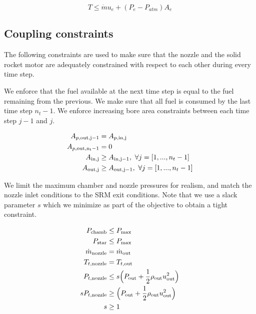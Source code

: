 \begin{equation}
    T \leq \dot{m} u_e + (P_e - P_{atm}) A_e
\end{equation}

\subsection{Coupling constraints}

The following constraints are used to make sure that the nozzle
and the solid rocket motor are adequately constrained
with respect to each other during every time step.

We enforce that the fuel available at the next time step is equal to the fuel
remaining from the previous. We make sure that all fuel is consumed
by the last time step $n_t-1$.
We enforce increasing bore area constraints between each
time step $j-1$ and $j$.

\begin{align}
    A_{p,\rm{out}, j-1} &= A_{p,\rm{in}, j} \\
    A_{p,\rm{out}, n_t-1} &= 0 \\
    A_{\rm{in}, j} &\geq A_{\rm{in}, j-1},~\forall j = [1,...,n_t-1] \\
    A_{\rm{out}, j} &\geq A_{\rm{out}, j-1},~\forall j = [1,...,n_t-1] \\
\end{align}

We limit the maximum chamber and nozzle pressures for realism, and match the nozzle
inlet conditions to the SRM exit conditions. Note that we use a slack parameter $s$
which we minimize as part of the objective to obtain a tight constraint.

\begin{align}
    P_{\rm{chamb}} &\leq P_{\rm{max}} \\
    P_{\rm{star}} &\leq P_{\rm{max}} \\
    \dot{m}_{\rm{nozzle}} &= \dot{m}_{\rm{out}} \\
    T_{t, \rm{nozzle}} &= T_{t,\rm{out}} \\
    P_{t,\rm{nozzle}} &\leq s \Big(P_{\rm{out}} + \frac{1}{2} \rho_{\rm{out}} u_{\rm{out}}^2\Big) \\
    s P_{t,\rm{nozzle}} &\geq \Big(P_{\rm{out}} + \frac{1}{2} \rho_{\rm{out}} u_{\rm{out}}^2\Big) \\
    s &\geq 1
\end{align}



